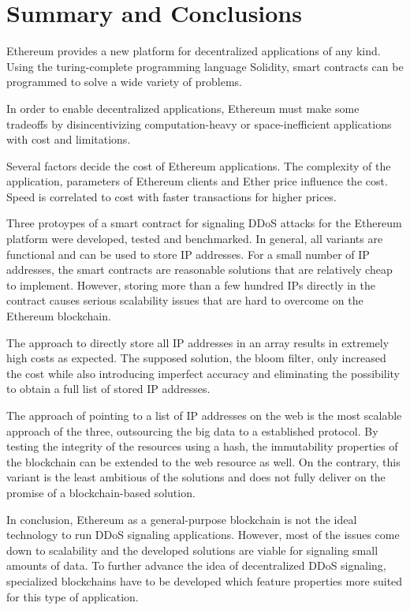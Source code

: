 \chapter{Summary and Conclusions}

Ethereum provides a new platform for decentralized applications of any kind. Using the turing-complete programming language Solidity, smart contracts can be programmed to solve a wide variety of problems.

In order to enable decentralized applications, Ethereum must make some tradeoffs by disincentivizing computation-heavy or space-inefficient applications with cost and limitations.

Several factors decide the cost of Ethereum applications. The complexity of the application, parameters of Ethereum clients and Ether price influence the cost. Speed is correlated to cost with faster transactions for higher prices.

Three protoypes of a smart contract for signaling DDoS attacks for the Ethereum platform were developed, tested and benchmarked. In general, all variants are functional and can be used to store IP addresses. For a small number of IP addresses, the smart contracts are reasonable solutions that are relatively cheap to implement. However, storing more than a few hundred IPs directly in the contract causes serious scalability issues that are hard to overcome on the Ethereum blockchain.

The approach to directly store all IP addresses in an array results in extremely high costs as expected. The supposed solution, the bloom filter, only increased the cost while also introducing imperfect accuracy and eliminating the possibility to obtain a full list of stored IP addresses.

The approach of pointing to a list of IP addresses on the web is the most scalable approach of the three, outsourcing the big data to a established protocol. By testing the integrity of the resources using a hash, the immutability properties of the blockchain can be extended to the web resource as well. On the contrary, this variant is the least ambitious of the solutions and does not fully deliver on the promise of a blockchain-based solution.

In conclusion, Ethereum as a general-purpose blockchain is not the ideal technology to run DDoS signaling applications. However, most of the issues come down to scalability and the developed solutions are viable for signaling small amounts of data. To further advance the idea of decentralized DDoS signaling, specialized blockchains have to be developed which feature properties more suited for this type of application.

